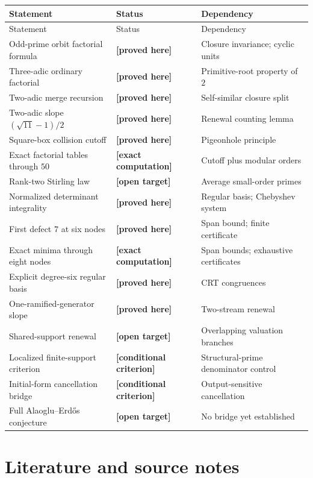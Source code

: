 \documentclass[11pt,oneside]{article}
\theoremstyle{definition}
\theoremstyle{remark}
\newcommand{\statusproved}{\textcolor{newgreen}{\textbf{[proved here]}}}
\newcommand{\statuscomputed}{\textcolor{compviolet}{\textbf{[exact computation]}}}
\newcommand{\statusopen}{\textcolor{openorange}{\textbf{[open target]}}}
\newcommand{\statusconditional}{\textcolor{openorange}{\textbf{[conditional criterion]}}}
\begin{document}
\begin{longtable}{@{}p{}p{}p{}@{}}
\toprule
Statement&Status&Dependency\\
\midrule
\endfirsthead
\toprule
Statement&Status&Dependency\\
\midrule
\endhead
Odd-prime orbit factorial formula&\statusproved&Closure invariance; cyclic units\\
Three-adic ordinary factorial&\statusproved&Primitive-root property of \(2\)\\
Two-adic merge recursion&\statusproved&Self-similar closure split\\
Two-adic slope \((\sqrt{11}-1)/2\)&\statusproved&Renewal counting lemma\\
Square-box collision cutoff&\statusproved&Pigeonhole principle\\
Exact factorial tables through \(50\)&\statuscomputed&Cutoff plus modular orders\\
Rank-two Stirling law&\statusopen&Average small-order primes\\
Normalized determinant integrality&\statusproved&Regular basis; Chebyshev system\\
First defect \(7\) at six nodes&\statusproved&Span bound; finite certificate\\
Exact minima through eight nodes&\statuscomputed&Span bounds; exhaustive certificates\\
Explicit degree-six regular basis&\statusproved&CRT congruences\\
One-ramified-generator slope&\statusproved&Two-stream renewal\\
Shared-support renewal&\statusopen&Overlapping valuation branches\\
Localized finite-support criterion&\statusconditional&Structural-prime denominator control\\
Initial-form cancellation bridge&\statusconditional&Output-sensitive cancellation\\
Full Alaoglu--Erd\H{o}s conjecture&\statusopen&No bridge yet established\\
\bottomrule
\end{longtable}

\section{Literature and source notes}
\label{app:literature}
\end{document}
